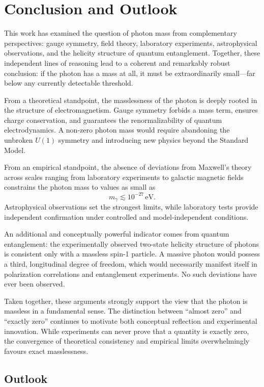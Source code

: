 \section{Conclusion and Outlook}

This work has examined the question of photon mass from complementary 
perspectives: gauge symmetry, field theory, laboratory experiments, 
astrophysical observations, and the helicity structure of quantum 
entanglement. Together, these independent lines of reasoning lead to a 
coherent and remarkably robust conclusion: if the photon has a mass at 
all, it must be extraordinarily small—far below any currently 
detectable threshold.

From a theoretical standpoint, the masslessness of the photon is deeply 
rooted in the structure of electromagnetism. Gauge symmetry forbids a 
mass term, ensures charge conservation, and guarantees the 
renormalizability of quantum electrodynamics. A non-zero photon mass 
would require abandoning the unbroken $U(1)$ symmetry and introducing 
new physics beyond the Standard Model.

From an empirical standpoint, the absence of deviations from Maxwell’s 
theory across scales ranging from laboratory experiments to galactic 
magnetic fields constrains the photon mass to values as small as
\[
m_\gamma \lesssim 10^{-27}\,\text{eV}.
\]
Astrophysical observations set the strongest limits, while laboratory 
tests provide independent confirmation under controlled and 
model-independent conditions.

An additional and conceptually powerful indicator comes from quantum 
entanglement: the experimentally observed two-state helicity structure 
of photons is consistent only with a massless spin-1 particle. A massive 
photon would possess a third, longitudinal degree of freedom, which 
would necessarily manifest itself in polarization correlations and 
entanglement experiments. No such deviations have ever been observed.

Taken together, these arguments strongly support the view that the 
photon is massless in a fundamental sense. The distinction between 
“almost zero” and “exactly zero” continues to motivate both conceptual 
reflection and experimental innovation. While experiments can never 
prove that a quantity is exactly zero, the convergence of theoretical 
consistency and empirical limits overwhelmingly favours exact 
masslessness.

\subsection*{Outlook}

